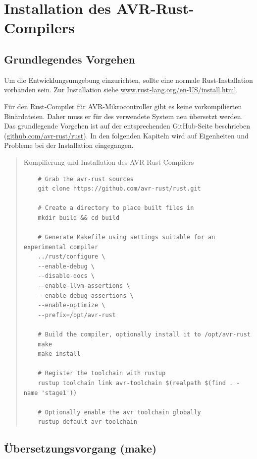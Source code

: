 \documentclass
[ 12pt,
  parskip=half %
]{scrreprt}
\newenvironment{mylisting}[1][H]
{\captionsetup{aboveskip=-0.2\normalbaselineskip}\begin{listing}[#1]}
	{\end{listing}}
\begin{document}
\section{Installation des AVR-Rust-Compilers}

\subsection{Grundlegendes Vorgehen}

Um die Entwicklungsumgebung einzurichten, sollte eine normale Rust-Installation vorhanden sein. Zur Installation siehe \href{https://www.rust-lang.org/en-US/install.html}{www.rust-lang.org/en-US/install.html}.

Für den Rust-Compiler für AVR-Mikrocontroller gibt es keine vorkompilierten Binärdateien. Daher muss er für des verwendete System neu übersetzt werden. Das grundlegende Vorgehen ist auf der entsprechenden GitHub-Seite beschrieben (\href{https://github.com/avr-rust/rust}{github.com/avr-rust/rust}). In den folgenden Kapiteln wird auf Eigenheiten und Probleme bei der Installation eingegangen.

\begin{quote}
	\begin{mylisting}[H]
		\caption{Kompilierung und Installation des AVR-Rust-Compilers  \cite{github-avr-rust}}
		\begin{verbatim}
	# Grab the avr-rust sources
	git clone https://github.com/avr-rust/rust.git
	
	# Create a directory to place built files in
	mkdir build && cd build
	
	# Generate Makefile using settings suitable for an experimental compiler
	../rust/configure \
	--enable-debug \
	--disable-docs \
	--enable-llvm-assertions \
	--enable-debug-assertions \
	--enable-optimize \
	--prefix=/opt/avr-rust
	
	# Build the compiler, optionally install it to /opt/avr-rust
	make
	make install
	
	# Register the toolchain with rustup
	rustup toolchain link avr-toolchain $(realpath $(find . -name 'stage1'))
	
	# Optionally enable the avr toolchain globally
	rustup default avr-toolchain
		\end{verbatim}
	\end{mylisting}
\end{quote}

\subsection{Übersetzungsvorgang (make)}
\end{document}
